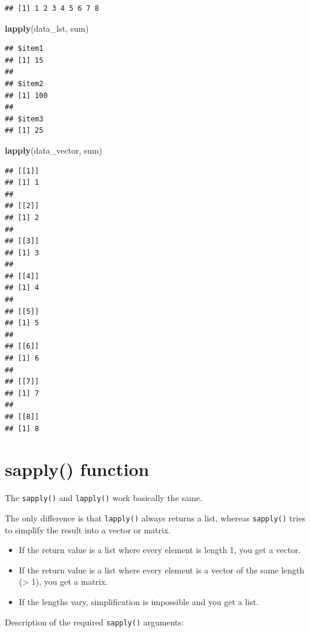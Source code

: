 \documentclass[
]{book}
\newenvironment{Shaded}{\begin{snugshade}}{\end{snugshade}}
\newcommand{\KeywordTok}[1]{\textcolor[rgb]{0.13,0.29,0.53}{\textbf{#1}}}
\newcommand{\NormalTok}[1]{#1}
\begin{document}
\begin{verbatim}
## [1] 1 2 3 4 5 6 7 8
\end{verbatim}

\begin{Shaded}
\begin{Highlighting}[]
\KeywordTok{lapply}\NormalTok{(data_lst, sum)}
\end{Highlighting}
\end{Shaded}

\begin{verbatim}
## $item1
## [1] 15
## 
## $item2
## [1] 100
## 
## $item3
## [1] 25
\end{verbatim}

\begin{Shaded}
\begin{Highlighting}[]
\KeywordTok{lapply}\NormalTok{(data_vector, sum)}
\end{Highlighting}
\end{Shaded}

\begin{verbatim}
## [[1]]
## [1] 1
## 
## [[2]]
## [1] 2
## 
## [[3]]
## [1] 3
## 
## [[4]]
## [1] 4
## 
## [[5]]
## [1] 5
## 
## [[6]]
## [1] 6
## 
## [[7]]
## [1] 7
## 
## [[8]]
## [1] 8
\end{verbatim}

\hypertarget{sapply-function}{%
\section{sapply() function}\label{sapply-function}}

The \texttt{sapply()} and \texttt{lapply()} work basically the same.

The only difference is that \texttt{lapply()} always returns a list, whereas \texttt{sapply()} tries to simplify the result into a vector or matrix.

\begin{itemize}
\item
  If the return value is a list where every element is length 1, you get a vector.
\item
  If the return value is a list where every element is a vector of the same length (\textgreater{} 1), you get a matrix.
\item
  If the lengths vary, simplification is impossible and you get a list.
\end{itemize}

Description of the required \texttt{sapply()} arguments:
\end{document}

